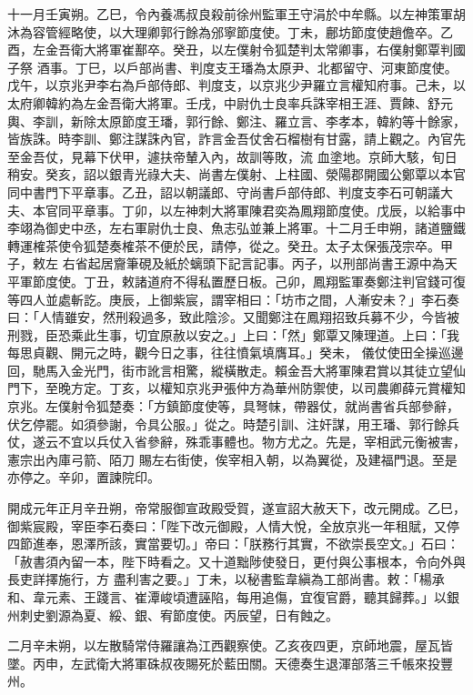 \begin{pinyinscope}
 十一月壬寅朔。乙巳，令內養馮叔良殺前徐州監軍王守涓於中牟縣。以左神策軍胡沐為容管經略使，以大理卿郭行餘為邠寧節度使。丁未，鄜坊節度使趙儋卒。乙酉，左金吾衛大將軍崔鄯卒。癸丑，以左僕射令狐楚判太常卿事，右僕射鄭覃判國子祭
 酒事。丁巳，以戶部尚書、判度支王璠為太原尹、北都留守、河東節度使。戊午，以京兆尹李右為戶部侍郎、判度支，以京兆少尹羅立言權知府事。己未，以太府卿韓約為左金吾衛大將軍。壬戌，中尉仇士良率兵誅宰相王涯、賈餗、舒元輿、李訓，新除太原節度王璠，郭行餘、鄭注、羅立言、李孝本，韓約等十餘家，皆族誅。時李訓、鄭注謀誅內官，詐言金吾仗舍石榴樹有甘露，請上觀之。內官先至金吾仗，見幕下伏甲，遽扶帝輦入內，故訓等敗，流
 血塗地。京師大駭，旬日稍安。癸亥，詔以銀青光祿大夫、尚書左僕射、上柱國、滎陽郡開國公鄭覃以本官同中書門下平章事。乙丑，詔以朝議郎、守尚書戶部侍郎、判度支李石可朝議大夫、本官同平章事。丁卯，以左神刺大將軍陳君奕為鳳翔節度使。戊辰，以給事中李翊為御史中丞，左右軍尉仇士良、魚志弘並兼上將軍。十二月壬申朔，諸道鹽鐵轉運榷茶使令狐楚奏榷茶不便於民，請停，從之。癸丑。太子太保張茂宗卒。甲子，敕左
 右省起居齎筆硯及紙於螭頭下記言記事。丙子，以刑部尚書王源中為天平軍節度使。丁丑，敕諸道府不得私置歷日板。己卯，鳳翔監軍奏鄭注判官錢可復等四人並處斬訖。庚辰，上御紫宸，謂宰相曰：「坊市之間，人漸安未？」李石奏曰：「人情雖安，然刑殺過多，致此陰沴。又聞鄭注在鳳翔招致兵募不少，今皆被刑戮，臣恐乘此生事，切宜原赦以安之。」上曰：「然」鄭覃又陳理道。上曰：「我每思貞觀、開元之時，觀今日之事，往往憤氣填膺耳。」癸未，
 儀仗使田全操巡邊回，馳馬入金光門，街市訛言相驚，縱橫散走。賴金吾大將軍陳君賞以其徒立望仙門下，至晚方定。丁亥，以權知京兆尹張仲方為華州防禦使，以司農卿薛元賞權知京兆。左僕射令狐楚奏：「方鎮節度使等，具弩帓，帶器仗，就尚書省兵部參辭，伏乞停罷。如須參謝，令具公服。」從之。時楚引訓、注奸謀，用王璠、郭行餘兵仗，遂云不宜以兵仗入省參辭，殊乖事體也。物方尤之。先是，宰相武元衡被害，憲宗出內庫弓箭、陌刀
 賜左右街使，俟宰相入朝，以為翼從，及建福門退。至是亦停之。辛卯，置諫院印。



 開成元年正月辛丑朔，帝常服御宣政殿受賀，遂宣詔大赦天下，改元開成。乙巳，御紫宸殿，宰臣李石奏曰：「陛下改元御殿，人情大悅，全放京兆一年租賦，又停四節進奉，恩澤所該，實當要切。」帝曰：「朕務行其實，不欲崇長空文。」石曰：「赦書須內留一本，陛下時看之。又十道黜陟使發日，更付與公事根本，令向外與長吏詳擇施行，方
 盡利害之要。」丁未，以秘書監韋縝為工部尚書。敕：「楊承和、韋元素、王踐言、崔潭峻頃遭誣陷，每用追傷，宜復官爵，聽其歸葬。」以銀州刺史劉源為夏、綏、銀、宥節度使。丙辰望，日有蝕之。



 二月辛未朔，以左散騎常侍羅讓為江西觀察使。乙亥夜四更，京師地震，屋瓦皆墜。丙申，左武衛大將軍硃叔夜賜死於藍田關。天德奏生退渾部落三千帳來投豐州。




\end{pinyinscope}
